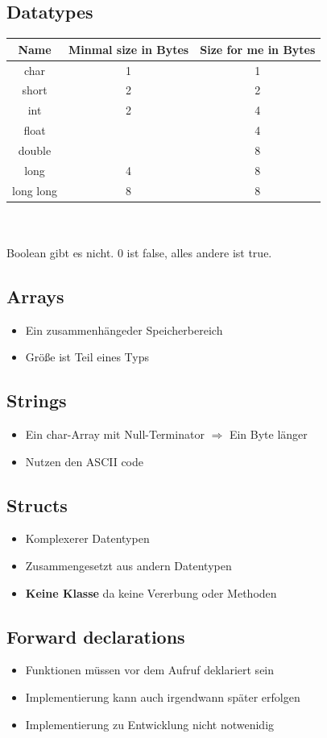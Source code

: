 \documentclass{kit}
\begin{document}
  \subsection{Datatypes}
    \begin{tabular}{ccc}
      Name & Minmal size in Bytes & Size for me in Bytes \\ \hline \hline
      char & 1 & 1 \\
      short & 2 & 2 \\
      int & 2 & 4 \\
      float &  & 4 \\
      double &  & 8 \\ \hline
      long & 4 & 8 \\
      long long & 8 & 8 \\ \hline
    \end{tabular}\\\\
    Boolean gibt es nicht. 0 ist false, alles andere ist true.
  \subsection{Arrays}
    \begin{itemize}
      \item Ein zusammenhängeder Speicherbereich
      \item Größe ist Teil eines Typs
    \end{itemize}
  \subsection{Strings}
    \begin{itemize}
      \item Ein char-Array mit Null-Terminator $\Rightarrow$ Ein Byte länger
      \item Nutzen den ASCII code
    \end{itemize}
  \subsection{Structs}
    \begin{itemize}
      \item Komplexerer Datentypen
      \item Zusammengesetzt aus andern Datentypen
      \item \textbf{Keine Klasse} da keine Vererbung oder Methoden
    \end{itemize}
  \subsection{Forward declarations}
    \begin{itemize}
      \item Funktionen müssen vor dem Aufruf deklariert sein
      \item Implementierung kann auch irgendwann später erfolgen
      \item Implementierung zu Entwicklung nicht notwenidig
    \end{itemize}
\end{document}
